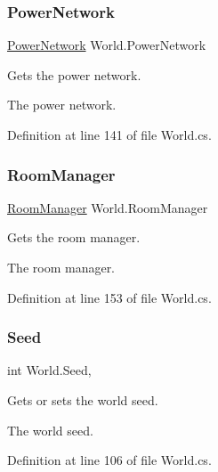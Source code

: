 \subsubsection{\texorpdfstring{Power\+Network}{PowerNetwork}}
{\footnotesize\ttfamily \hyperlink{class_project_porcupine_1_1_power_network_1_1_power_network}{Power\+Network} World.\+Power\+Network\hspace{0.3cm}{\ttfamily [get]}}



Gets the power network. 

The power network.

Definition at line 141 of file World.\+cs.

\mbox{\label{class_world_aa0c1e3f4fff3462c848030f89ef5ebf5}} 
\subsubsection{\texorpdfstring{Room\+Manager}{RoomManager}}
{\footnotesize\ttfamily \hyperlink{class_project_porcupine_1_1_rooms_1_1_room_manager}{Room\+Manager} World.\+Room\+Manager\hspace{0.3cm}{\ttfamily [get]}}



Gets the room manager. 

The room manager.

Definition at line 153 of file World.\+cs.

\mbox{\label{class_world_a41b0e31e73a738aece63fcd312be09fa}} 
\subsubsection{\texorpdfstring{Seed}{Seed}}
{\footnotesize\ttfamily int World.\+Seed\hspace{0.3cm}{\ttfamily [get]}, {}}



Gets or sets the world seed. 

The world seed.

Definition at line 106 of file World.\+cs.

\mbox{\label{class_world_a74a18f145ecbf627f2dccb454e06be43}} 
